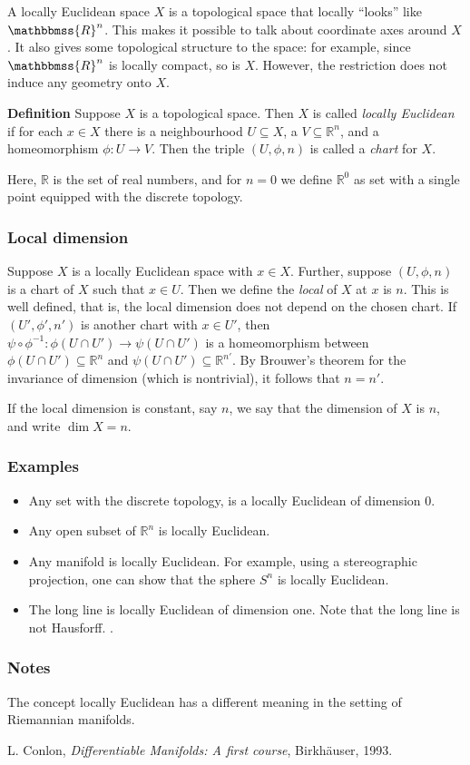 \documentclass[12pt]{article}
\newcommand{\sR}[0]{\mathbb{R}}
\newcommand{\R}{\mathbbmss{R}}
\begin{document}
A locally Euclidean space $X$ is a topological space that locally
``looks'' like $\R^n$.
This makes it possible to talk about 
coordinate axes around $X$. It also gives some topological structure
to the space: for example, since $\R^n$ is locally compact, so is $X$. 
However, the restriction does not induce any geometry onto $X$. 

{\bf Definition} 
Suppose $X$ is a topological space. Then $X$ is
called \emph{locally Euclidean} if for each $x\in X$ there is a neighbourhood
 $U\subseteq X$, a $V\subseteq \sR^n$, and
a homeomorphism $\phi: U\to V$. Then the triple $(U,\phi, n)$
is called a \emph{chart} for $X$.

Here, $\sR$ is the set of real numbers, and for $n=0$ we define
$\sR^0$ as set with a single point equipped with the discrete topology.

\subsubsection*{Local dimension}
Suppose $X$ is a locally Euclidean space with $x\in X$. Further,
suppose $(U,\phi, n)$ is a chart of $X$ such that $x\in U$.
Then we define the \emph{local } of $X$ at $x$ is $n$.
This is well defined, that is, the local dimension does not
depend on the chosen chart. If
$(U',\phi', n')$ is another chart with $x\in U'$, then
$\psi\circ \phi^{-1}: \phi(U\cap U') \to \psi(U\cap U')$
is a homeomorphism between $\phi(U\cap U')\subseteq \sR^n$
and $\psi(U\cap U')\subseteq \sR^{n'}$. By Brouwer's theorem
for the invariance of dimension (which is nontrivial),
it follows that $n=n'$.

If the local dimension is constant, say $n$, we say that the dimension
of $X$ is $n$, and write $\dim X = n$. 
\subsubsection*{Examples}
\begin{itemize}
\item Any set with the discrete topology, is a locally 
      Euclidean of dimension $0.$ 
\item Any open subset of $\sR^n$ is locally Euclidean.
\item Any manifold is locally Euclidean. For example, 
using a stereographic projection, one can show that the sphere $S^n$
is locally Euclidean.
\item The long line is locally Euclidean of dimension one.  Note that the long line is not Hausforff. \cite{conlon}.
\end{itemize}

\subsubsection*{Notes}
The concept locally Euclidean has a different meaning in the
setting of Riemannian manifolds. 

\begin{thebibliography}{9}
  L. Conlon, \emph{Differentiable Manifolds: A first course},
Birkh\"auser, 1993.
\end{thebibliography}
\end{document}
